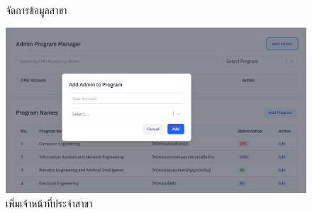 \begin{itemize}
\begin{figure}[H]
    \caption{จัดการข้อมูลสาขา}
\end{figure}
\begin{figure}[H]
    \centering
    \includegraphics[width=130mm, keepaspectratio ]{pictures/project_box/add_program_admin.png}
    \caption{เพิ่มเจ้าหน้าที่ประจำสาขา}
\end{figure}
\end{itemize}
